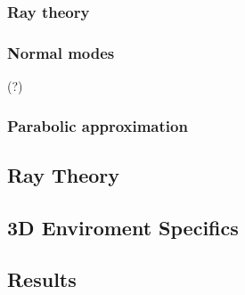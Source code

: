 \subsubsection{Ray theory} \cite{torres2007modeling} \cite{danesh2013real}
\subsubsection{Normal modes} \cite{Etter2013}(?)
\subsubsection{Parabolic approximation} \cite{LURTON}

\subsection{Ray Theory}
\subsection{3D Enviroment Specifics}
\subsection{Results}
